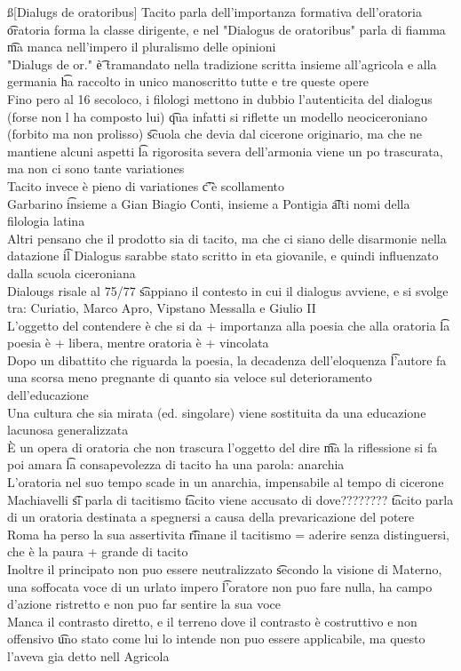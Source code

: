 \documentclass[12pt]{article}
\begin{document}
\ss[Dialugs de oratoribus]
Tacito parla dell'importanza formativa dell'oratoria \t oratoria forma la classe dirigente, e nel "Dialogus de oratoribus" parla di fiamma \t ma manca nell'impero il pluralismo delle opinioni \\
"Dialugs de or." \t è tramandato nella tradizione scritta insieme all'agricola e alla germania \t ha raccolto in unico manoscritto tutte e tre queste opere \\
Fino pero al 16 secoloco, i filologi mettono in dubbio l'autenticita del dialogus (forse non l ha composto lui) \t qua infatti si riflette un modello neociceroniano (forbito ma non prolisso) \t scuola che devia dal cicerone originario, ma che ne mantiene alcuni aspetti \t la rigorosita severa dell'armonia viene un po trascurata, ma non ci sono tante variationes \\
Tacito invece è pieno di variationes \t c'è scollamento \\
Garbarino \t insieme a Gian Biagio Conti, insieme a Pontigia \t alti nomi della filologia latina \\
Altri pensano che il prodotto sia di tacito, ma che ci siano delle disarmonie nella datazione \t il Dialogus sarabbe stato scritto in eta giovanile, e quindi influenzato dalla scuola ciceroniana \\
Dialougs risale al 75/77 \t sappiano il contesto in cui il dialogus avviene, e si svolge tra: Curiatio, Marco Apro, Vipstano Messalla e Giulio II \\
L'oggetto del contendere è che si da + importanza alla poesia che alla oratoria \t la poesia è + libera, mentre oratoria è + vincolata \\
Dopo un dibattito che riguarda la poesia, la decadenza dell'eloquenza \t l'autore fa una scorsa meno pregnante di quanto sia veloce sul deterioramento dell'educazione \\
Una cultura che sia mirata (ed. singolare) viene sostituita da una educazione lacunosa generalizzata \\
È un opera di oratoria che non trascura l'oggetto del dire \t ma la riflessione si fa poi amara \t la consapevolezza di tacito ha una parola: anarchia \\
L'oratoria nel suo tempo scade in un anarchia, impensabile al tempo di cicerone \\
Machiavelli \t si parla di tacitismo \t tacito viene accusato di dove???????? \t tacito parla di un oratoria destinata a spegnersi a causa della prevaricazione del potere \\
Roma ha perso la sua assertivita \t rimane il tacitismo = aderire senza distinguersi, che è la paura + grande di tacito \\
Inoltre il principato non puo essere neutralizzato \t secondo la visione di Materno, una soffocata voce di un urlato impero \t l'oratore non puo fare nulla, ha campo d'azione ristretto e non puo far sentire la sua voce \\
Manca il contrasto diretto, e il terreno dove il contrasto è costruttivo e non offensivo \t uno stato come lui lo intende non puo essere applicabile, ma questo l'aveva gia detto nell Agricola
\end{document}

